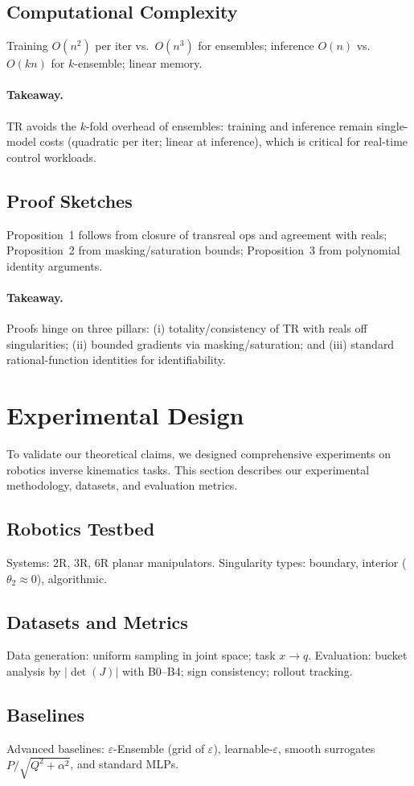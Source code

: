 \documentclass[twoside,11pt]{article}
\begin{document}
\subsection{Computational Complexity}
Training $O(n^2)$ per iter vs.\ $O(n^3)$ for ensembles; inference $O(n)$ vs.\ $O(kn)$ for $k$-ensemble; linear memory.
\paragraph{Takeaway.} TR avoids the $k$-fold overhead of ensembles: training and inference remain single-model costs (quadratic per iter; linear at inference), which is critical for real-time control workloads.
\subsection{Proof Sketches}
Proposition~1 follows from closure of transreal ops and agreement with reals; Proposition~2 from masking/saturation bounds; Proposition~3 from polynomial identity arguments.
\paragraph{Takeaway.} Proofs hinge on three pillars: (i) totality/consistency of TR with reals off singularities; (ii) bounded gradients via masking/saturation; and (iii) standard rational-function identities for identifiability.

\section{Experimental Design}
\label{sec:experimental_design}
To validate our theoretical claims, we designed comprehensive experiments on robotics inverse kinematics tasks. This section describes our experimental methodology, datasets, and evaluation metrics.

\subsection{Robotics Testbed}
Systems: 2R, 3R, 6R planar manipulators. Singularity types: boundary, interior ($\theta_2\approx 0$), algorithmic.
\subsection{Datasets and Metrics}
Data generation: uniform sampling in joint space; task $x\to q$.
Evaluation: bucket analysis by $|\det(J)|$ with B0--B4; sign consistency; rollout tracking.
\subsection{Baselines}
Advanced baselines: $\varepsilon$-Ensemble (grid of $\varepsilon$), learnable-$\varepsilon$, smooth surrogates $P/\sqrt{Q^2+\alpha^2}$, and standard MLPs.
\end{document}
